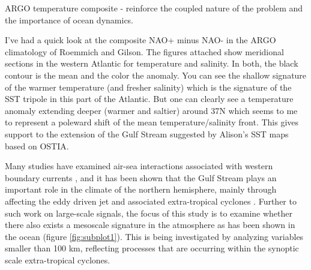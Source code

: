ARGO temperature composite - reinforce the coupled nature of the problem and the importance of ocean dynamics.

I’ve had a quick look at the composite NAO+ minus NAO- in the ARGO climatology of Roemmich and Gilson. The figures attached show meridional sections in the western Atlantic for temperature and salinity. In both, the black contour is the mean and the color the anomaly. You can see the shallow signature of the warmer temperature (and fresher salinity) which is the signature of the SST tripole in this part of the Atlantic. But one can clearly see a temperature anomaly extending deeper (warmer and saltier) around 37N which seems to me to represent a poleward shift of the mean temperature/salinity front. This gives support to the extension of the Gulf Stream suggested by Alison’s SST maps based on OSTIA.




Many studies have examined air-sea interactions associated with western boundary currents  \citep{ma2015distant, shaman2010air, kwon2010role, czaja2001observations, czaja2002observed, minobe2008influence, smirnov2015investigating, kelly2010western, cayan1992latent}, and it has been shown that the Gulf Stream plays an important role in the climate of the northern hemisphere, mainly through affecting the eddy driven jet and associated extra-tropical cyclones \citep{sampe2010significance, nakamura2008importance, booth2012sensitivity, small2014storm, woollings2012response, vanniere2017contribution, vanniere2017cold}. Further to such work on large-scale signals, the focus of this study is to examine whether there also exists a mesoscale signature in the atmosphere as has been shown in the ocean (figure \ref{fig:subplot1}). This is being investigated by analyzing variables smaller than 100 km, reflecting processes that are occurring within the synoptic scale extra-tropical cyclones.


